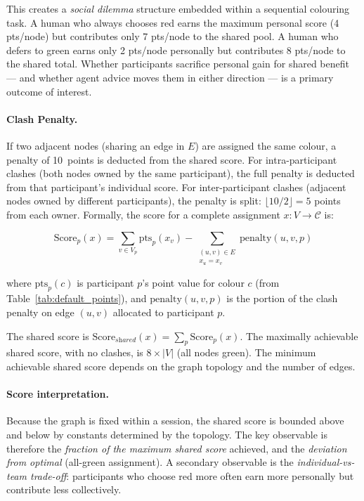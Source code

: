 \documentclass[11pt]{article}
\theoremstyle{definition}
\newcommand{\Shared}{\textit{shared}}
\begin{document}
This creates a \emph{social dilemma} structure embedded within a sequential colouring
task.  A human who always chooses red earns the maximum personal score (4 pts/node)
but contributes only 7 pts/node to the shared pool.  A human who defers to green earns
only 2 pts/node personally but contributes 8 pts/node to the shared total.  Whether
participants sacrifice personal gain for shared benefit --- and whether agent advice
moves them in either direction --- is a primary outcome of interest.

\paragraph{Clash Penalty.}
If two adjacent nodes (sharing an edge in $E$) are assigned the same colour, a penalty
of 10~points is deducted from the shared score.  For intra-participant clashes (both
nodes owned by the same participant), the full penalty is deducted from that participant's
individual score.  For inter-participant clashes (adjacent nodes owned by different
participants), the penalty is split: $\lfloor 10/2 \rfloor = 5$ points from each owner.
Formally, the score for a complete assignment $x : V \to \mathcal{C}$ is:

\begin{equation}
  \text{Score}_p(x) = \sum_{v \in V_p} \text{pts}_p(x_v)
    - \sum_{\substack{(u,v) \in E \\ x_u = x_v}} \text{penalty}(u, v, p)
  \label{eq:score}
\end{equation}

where $\text{pts}_p(c)$ is participant $p$'s point value for colour $c$ (from
Table~\ref{tab:default_points}), and $\text{penalty}(u, v, p)$ is the portion of the
clash penalty on edge $(u,v)$ allocated to participant $p$.

The shared score is $\text{Score}_{\Shared}(x) = \sum_p \text{Score}_p(x)$.  The
maximally achievable shared score, with no clashes, is $8 \times |V|$ (all nodes
green).  The minimum achievable shared score depends on the graph topology and the
number of edges.

\paragraph{Score interpretation.}
Because the graph is fixed within a session, the shared score is bounded above and
below by constants determined by the topology.  The key observable is therefore the
\emph{fraction of the maximum shared score} achieved, and the \emph{deviation from
optimal} (all-green assignment).  A secondary observable is the \emph{individual-vs-team
trade-off}: participants who choose red more often earn more personally but contribute
less collectively.
\end{document}
